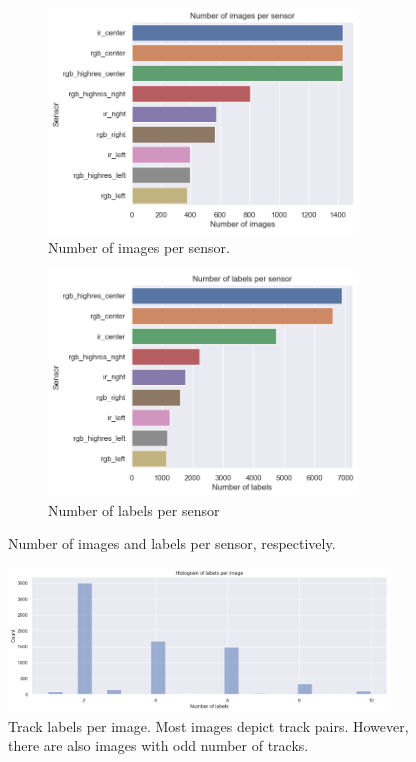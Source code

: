 \documentclass[Master,MDS,english]{BASE/twbook} %
\begin{document}
\begin{figure}
\centering
\begin{subfigure}[t]{.5\textwidth}
  \centering
  \includegraphics[width=0.9\textwidth]{images/datasets/db/images_per_sensor}
  \caption{Number of images per sensor.}
\end{subfigure}%
\begin{subfigure}[t]{.5\textwidth}
  \centering
  \includegraphics[width=0.9\textwidth]{images/datasets/db/labels_per_sensor}
  \caption{Number of labels per sensor}
\end{subfigure}
\caption{Number of images and labels per sensor, respectively.}
\label{fig:number_images}
\end{figure}


\begin{figure}[h]
\centering
\includegraphics[width=0.9\textwidth]{images/datasets/db/labels_per_image}
\caption{Track labels per image. Most images depict track pairs. However, there are also images with odd number of tracks. }
\label{fig:labels_per_image}
\end{figure}
\end{document}
